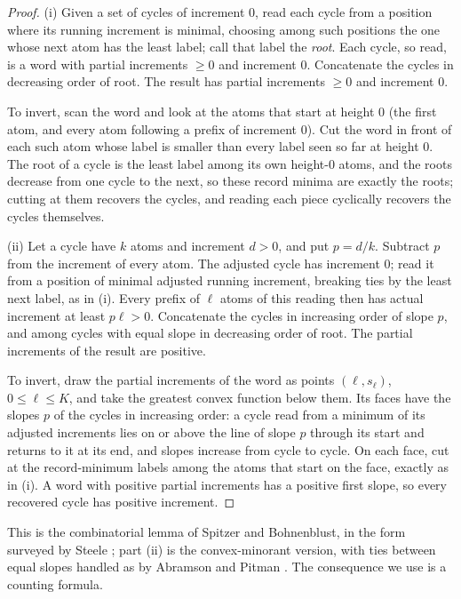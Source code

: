\documentclass[11pt]{amsart}
\theoremstyle{definition}
\theoremstyle{remark}
\begin{document}
\begin{proof}
(i) Given a set of cycles of increment $0$, read each cycle from a position where its running increment is minimal,
choosing among such positions the one whose next atom has the least label; call that label the \emph{root}. Each cycle,
so read, is a word with partial increments $\ge0$ and increment $0$. Concatenate the cycles in decreasing order of
root. The result has partial increments $\ge0$ and increment $0$.

To invert, scan the word and look at the atoms that start at height $0$ (the first atom, and every atom following a
prefix of increment $0$). Cut the word in front of each such atom whose label is smaller than every label seen so far at
height $0$. The root of a cycle is the least label among its own height-$0$ atoms, and the roots decrease from one cycle
to the next, so these record minima are exactly the roots; cutting at them recovers the cycles, and reading each piece
cyclically recovers the cycles themselves.

(ii) Let a cycle have $k$ atoms and increment $d>0$, and put $p=d/k$. Subtract $p$ from the increment of every atom.
The adjusted cycle has increment $0$; read it from a position of minimal adjusted running increment, breaking ties by
the least next label, as in (i). Every prefix of $\ell$ atoms of this reading then has actual increment at least
$p\ell>0$. Concatenate the cycles in increasing order of slope $p$, and among cycles with equal slope in decreasing order
of root. The partial increments of the result are positive.

To invert, draw the partial increments of the word as points $(\ell,s_\ell)$, $0\le\ell\le K$, and take the greatest
convex function below them. Its faces have the slopes $p$ of the cycles in increasing order: a cycle read from a minimum
of its adjusted increments lies on or above the line of slope $p$ through its start and returns to it at its end, and
slopes increase from cycle to cycle. On each face, cut at the record-minimum labels among the atoms that start on the
face, exactly as in (i). A word with positive partial increments has a positive first slope, so every recovered cycle
has positive increment.
\end{proof}

This is the combinatorial lemma of Spitzer and Bohnenblust, in the form surveyed by Steele \cite{St}; part (ii) is the
convex-minorant version, with ties between equal slopes handled as by Abramson and Pitman \cite{AP}. The consequence we
use is a counting formula.
\end{document}
